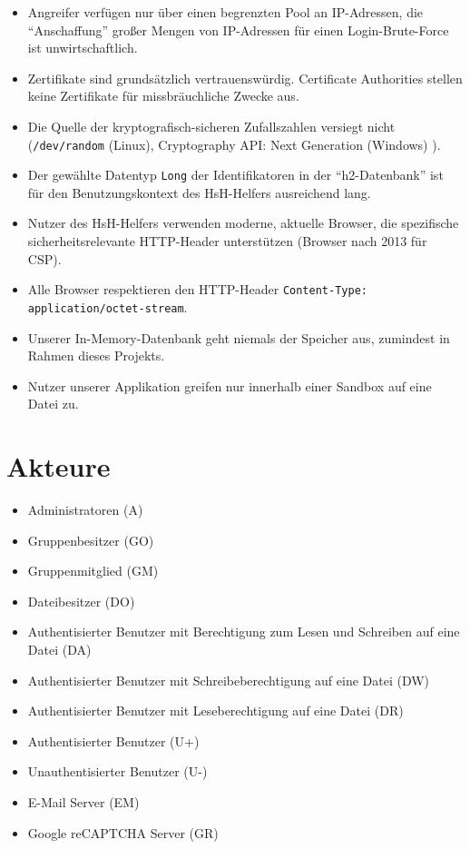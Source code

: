 \documentclass[fontsize=12pt,DIV=14,BCOR=10mm,a4paper,parskip=half-,headsepline,headinclude,english,ngerman,bibliography=totocnumbered]{scrreprt}
\begin{document}
\begin{itemize}
  \item Angreifer verfügen nur über einen begrenzten Pool an IP-Adressen, die \enquote{Anschaffung} großer Mengen von IP-Adressen für einen Login-Brute-Force ist unwirtschaftlich.
  \item Zertifikate sind grundsätzlich vertrauenswürdig. Certificate Authorities stellen keine Zertifikate für missbräuchliche Zwecke aus.
  \item Die Quelle der kryptografisch-sicheren Zufallszahlen versiegt nicht (\texttt{/dev/random} (Linux), Cryptography API: Next Generation (Windows) \autocite{Windows.SecureRandom}).
  \item Der gewählte Datentyp \texttt{Long} der Identifikatoren in der \enquote{h2-Datenbank} ist für den Benutzungskontext des HsH-Helfers ausreichend lang.
  \item Nutzer des HsH-Helfers verwenden moderne, aktuelle Browser, die spezifische sicherheitsrelevante HTTP-Header unterstützen (Browser nach 2013 für CSP).
  \item Alle Browser respektieren den HTTP-Header \texttt{Content-Type: application/octet-stream}.
  \item Unserer In-Memory-Datenbank geht niemals der Speicher aus, zumindest in Rahmen dieses Projekts.
  \item Nutzer unserer Applikation greifen nur innerhalb einer Sandbox auf eine Datei zu.
\end{itemize}

\renewcommand*{\chapterheadstartvskip}{\vspace*{\topskip}}

\chapter{Akteure}

\begin{itemize}
  \item Administratoren (A)
  \item Gruppenbesitzer (GO)
  \item Gruppenmitglied (GM)
  \item Dateibesitzer (DO)
  \item Authentisierter Benutzer mit Berechtigung zum Lesen und Schreiben auf eine Datei (DA)
  \item Authentisierter Benutzer mit Schreibeberechtigung auf eine Datei (DW)
  \item Authentisierter Benutzer mit Leseberechtigung auf eine Datei (DR)
  \item Authentisierter Benutzer (U+)
  \item Unauthentisierter Benutzer (U-)
  \item E-Mail Server (EM)
  \item Google reCAPTCHA Server (GR)
\end{itemize}
\end{document}
